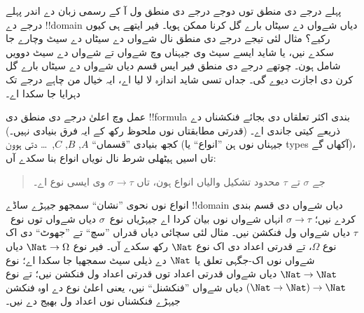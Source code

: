 \documentclass[../../../include/open-logic-section]{subfiles}
\begin{document}


پہلے درجے دی منطق توں دوجے درجے دی منطق
ول آ کے رسمی زبان دے اندر پہلے درجے دے
!!{domain} دیاں شےواں دے سیٹاں بارے
گل کرنا ممکن ہویا۔ فیر ایتھے ہی کیوں
رکیے؟ مثال لئی تیجے درجے دی منطق نال
شےواں دے سیٹاں دے سیٹ وچارے جا سکدے
نیں، یا شاید ایسے سیٹ وی جیہناں وچ
شےواں تے شےواں دے سیٹ دوویں شامل ہون۔
چوتھے درجے دی منطق فیر ایس قسم دیاں
شےواں دے سیٹاں بارے گل کرن دی
اجازت دیوے گی۔ جداں تسی شاید
اندازہ لا لیا اے، ایہ خیال
من چاہے درجے تک دہرایا جا سکدا اے۔

عمل وچ اعلیٰ درجے دی منطق دی
!!{formula} بندی اکثر تعلقاں دی بجائے فنکشناں
دے ذریعے کیتی جاندی اے۔
(قدرتی مطابقتاں نوں ملحوظ رکھ کے
ایہ فرق بنیادی نہیں۔) کجھ بنیادی
”قسماں“ $A$, $B$, $C$,~\dots
دتی ہوون (جیہناں نوں ہن ”انواع“
یا types آکھاں گے)، تاں اسیں
ہیٹھلی شرط نال نویاں انواع بنا
سکدے آں:
\begin{quote}
جے $\sigma$ تے $\tau$ محدود
تشکیل والیاں انواع ہون،
تاں $\sigma \to \tau$ وی ایسی
نوع اے۔
\end{quote}
انواع نوں نحوی ”نشان“ سمجھو
جیہڑے ساڈے !!{domain} دیاں
شےواں دی قسم بندی کردے نیں؛
$\sigma \to \tau$ انہاں شےواں
نوں بیان کردا اے جیہڑیاں نوع~$\sigma$
دیاں شےواں توں نوع~$\tau$ دیاں
شےواں ول فنکشن نیں۔ مثال لئی
سچائی دیاں قدراں ”سچ“ تے ”جھوٹ“
دی اک نوع $\Omega$، تے قدرتی
اعداد دی اک نوع $\Nat$ رکھ
سکدے آں۔ فیر نوع $\Nat \to
\Omega$ دیاں شےواں نوں اک-جگہی
تعلق یا $\Nat$ دے ذیلی سیٹ
سمجھیا جا سکدا اے؛ نوع
$\Nat \to \Nat$ دیاں شےواں
قدرتی اعداد توں قدرتی اعداد
ول فنکشن نیں؛ تے نوع
$(\Nat \to \Nat) \to \Nat$
دیاں شےواں ”فنکشنل“
نیں، یعنی اعلیٰ نوع دے
اوہ فنکشن جیہڑے فنکشناں نوں
اعداد ول بھیج دے نیں۔
\end{document}

